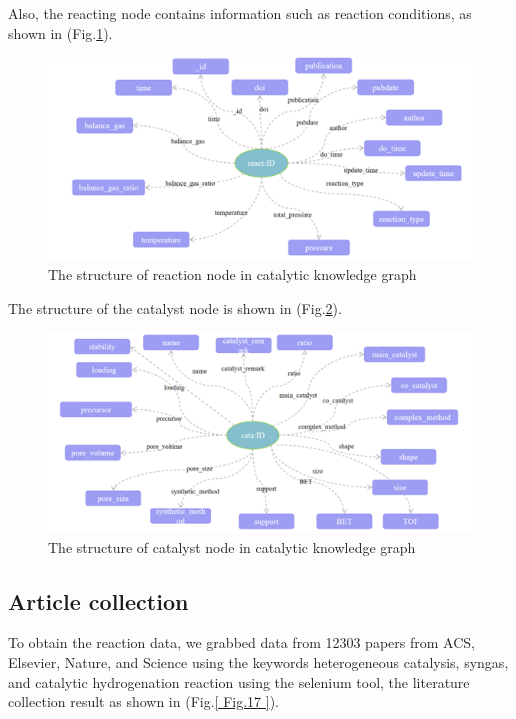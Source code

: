 \documentclass[%
 aip,
 jmp,%
 amsmath,amssymb,
 reprint,%
]{revtex4-2}
\begin{document}
Also, the reacting node contains information such as reaction conditions, as shown in (Fig.\ref{ Fig.15 }).
\begin{figure}[htbp]
 \centering
 \includegraphics[width=1\textwidth]{figure/15.png}
 \caption{ The structure of reaction node in catalytic knowledge graph }
 \label{ Fig.15 }
\end{figure}

The structure of the catalyst node is shown in (Fig.\ref{ Fig.16 }).

\begin{figure}[htbp]
 \centering
 \includegraphics[width=1\textwidth]{figure/16.png}
 \caption{ The structure of catalyst node in catalytic knowledge graph }
 \label{ Fig.16 }
\end{figure}

\subsection{Article collection}
To obtain the reaction data, we grabbed data from 12303 papers from ACS, Elsevier, Nature, and Science using the keywords heterogeneous catalysis, syngas, and catalytic hydrogenation reaction using the selenium tool, the literature collection result as shown in (Fig.\ref{ Fig.17 }).
\end{document}
